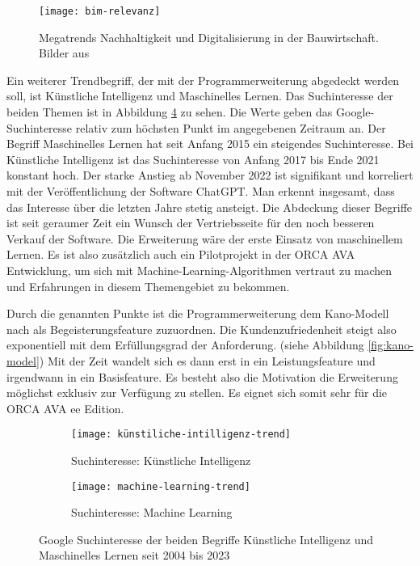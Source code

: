 \begin{figure}[h]
	\centering
	\texttt{[image: bim-relevanz]}
	\caption[Relevanz \ac{bim}]
	{Megatrends Nachhaltigkeit und Digitalisierung in der Bauwirtschaft. Bilder aus \citep[p.~20]{Thomas_Baumanns_Dr_Philipp-Stephan_Freber_Dr_Kai-Stefan_Schober_Dr_Florian_Kirchner2016-gu}}
	\label{fig:bim}
\end{figure}
Ein weiterer Trendbegriff, der mit der Programmerweiterung abgedeckt werden soll, ist \glqq Künstliche Intelligenz\grqq{} und \glqq Maschinelles Lernen\grqq{}. Das Suchinteresse der beiden Themen ist in Abbildung \ref{fig:ki-ml-trend} zu sehen. Die Werte geben das Google-Suchinteresse relativ zum höchsten Punkt im angegebenen Zeitraum an. Der Begriff \glqq Maschinelles Lernen\grqq{} hat seit Anfang 2015 ein steigendes Suchinteresse. Bei \glqq Künstliche Intelligenz\grqq{} ist das Suchinteresse von Anfang 2017 bis Ende 2021 konstant hoch. Der starke Anstieg ab November 2022 ist signifikant und korreliert mit der Veröffentlichung der Software ChatGPT. Man erkennt insgesamt, dass das Interesse über die letzten Jahre stetig ansteigt. Die Abdeckung dieser Begriffe ist seit geraumer Zeit ein Wunsch der Vertriebsseite für den noch besseren Verkauf der Software. Die Erweiterung wäre der erste Einsatz von maschinellem Lernen. Es ist also zusätzlich auch ein Pilotprojekt in der ORCA AVA Entwicklung, um sich mit Machine-Learning-Algorithmen vertraut zu machen und Erfahrungen in diesem Themengebiet zu bekommen.

Durch die genannten Punkte ist die Programmerweiterung dem Kano-Modell nach als Begeisterungsfeature zuzuordnen. Die Kundenzufriedenheit steigt also exponentiell mit dem Erfüllungsgrad der Anforderung. (siehe Abbildung \ref{fig:kano-model}) Mit der Zeit wandelt sich es dann erst in ein Leistungsfeature und irgendwann in ein Basisfeature. \citep[p.~3-4]{Hölzing_2008} Es besteht also die Motivation die Erweiterung möglichst exklusiv zur Verfügung zu stellen. Es eignet sich somit sehr für die ORCA AVA \ac{ee} Edition.

\begin{figure}[h]
	\centering
	
	\begin{subfigure}{0.99\textwidth}
		\centering
	\texttt{[image: künstiliche-intilligenz-trend]}
		\caption{Suchinteresse: Künstliche Intelligenz}
		\label{FIG:ki-trend}
	\end{subfigure}
	\hspace{1cm}
	\begin{subfigure}{0.99\textwidth}
		\centering
	\texttt{[image: machine-learning-trend]}
		\caption{Suchinteresse: Machine Learning}
		\label{FIG:ml-trend}
	\end{subfigure}
	
	\caption[Google Trends]{Google Suchinteresse der beiden Begriffe \glqq Künstliche Intelligenz\grqq{} und \glqq Maschinelles Lernen{} seit 2004 bis 2023}
	\label{fig:ki-ml-trend}
\end{figure}

